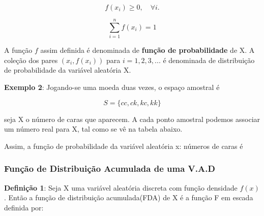 $$
f(x_{i}) \geq 0, \quad \forall i.
$$

$$
\sum_{i=1}^{n}f(x_{i})=1
$$


A função $f$ assim definida é denominada de \textbf{função de
probabilidade} de X. A coleção dos pares $(x_{i}, f(x_{i}))$ para
$i=1,2,3,...$ é denominada de distribuição de probabilidade da
variável aleatória X.\vskip0.3cm

\textbf{Exemplo 2}: Jogando-se uma moeda duas vezes, o espaço
amostral é

$$
S= \{ cc, ck, kc, kk \}
$$

seja X o número de caras que aparecem. A cada ponto amostral
podemos associar um número real para X, tal como se vê na tabela
abaixo.




\begin{table}[!htb]
\end{table}



Assim, a função de probabilidade da variável aleatória x: números
de caras é

\begin{table}[!htb]
\end{table}


\newpage
\subsubsection{Função de Distribuição Acumulada de uma V.A.D}

\textbf{Definição 1}: Seja X uma variável aleatória discreta com
função densidade $f(x)$. Então a função de distribuição
acumulada(FDA) de X é a função F em escada definida por:

